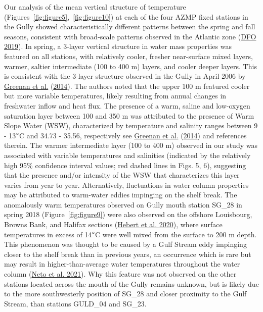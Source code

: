 \documentclass[12pt]{article}\usepackage[]{graphicx}\usepackage[]{color}
\begin{document}
Our analysis of the mean vertical structure of temperature (Figures~\ref{fig:figure5},~\ref{fig:figure10}) at each of the four AZMP fixed stations in the Gully showed characteristically different patterns between the spring and fall seasons, consistent with broad-scale patterns observed in the Atlantic zone (\protect\hyperlink{ref-dfo_2019}{DFO 2019}). In spring, a 3-layer vertical structure in water mass properties was featured on all stations, with relatively cooler, fresher near-surface mixed layers, warmer, saltier intermediate (100 to 400 m) layers, and cooler deeper layers. This is consistent with the 3-layer structure observed in the Gully in April 2006 by \protect\hyperlink{ref-greenan_2014}{Greenan et al.} (\protect\hyperlink{ref-greenan_2014}{2014}). The authors noted that the upper 100 m featured cooler but more variable temperatures, likely resulting from annual changes in freshwater inflow and heat flux. The presence of a warm, saline and low-oxygen saturation layer between 100 and 350 m was attributed to the presence of Warm Slope Water (WSW), characterized by temperature and salinity ranges between 9 - 13\(\degree\)C and 34.73 - 35.56, respectively see \thinspace \protect\hyperlink{ref-greenan_2014}{Greenan et al.} (\protect\hyperlink{ref-greenan_2014}{2014}) and references therein. The warmer intermediate layer (100 to 400 m) observed in our study was associated with variable temperatures and salinities (indicated by the relatively high 95\% confidence interval values; red dashed lines in Figs. 5, 6), suggesting that the presence and/or intensity of the WSW that characterizes this layer varies from year to year. Alternatively, fluctuations in water column properties may be attributed to warm-water eddies impinging on the shelf break. The anomalously warm temperatures observed on Gully mouth station SG\_28 in spring 2018 (Figure~\ref{fig:figure9}) were also observed on the offshore Louisbourg, Browns Bank, and Halifax sections (\protect\hyperlink{ref-hebert_2020}{Hebert et al. 2020}), where surface temperatures in excess of 14\(\degree\)C were well mixed from the surface to 200 m depth. This phenomenon was thought to be caused by a Gulf Stream eddy impinging closer to the shelf break than in previous years, an occurrence which is rare but may result in higher-than-average water temperatures throughout the water column (\protect\hyperlink{ref-neto_2021}{Neto et al. 2021}). Why this feature was not observed on the other stations located across the mouth of the Gully remains unknown, but is likely due to the more southwesterly position of SG\_28 and closer proximity to the Gulf Stream, than stations GULD\_04 and SG\_23.
\end{document}
